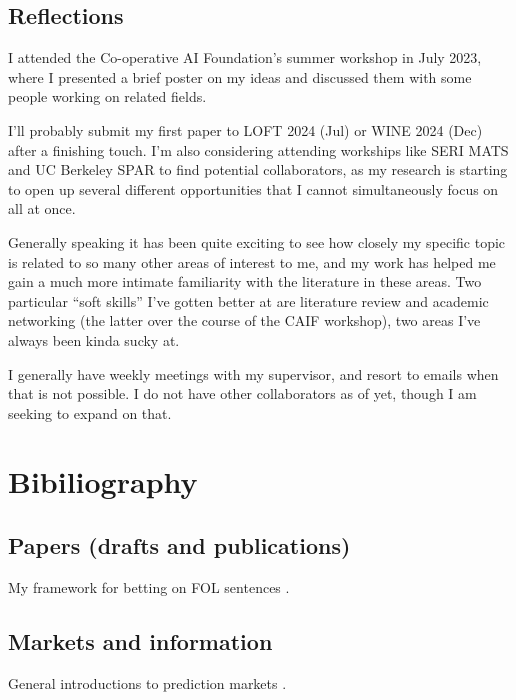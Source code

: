 \documentclass{article}
\begin{document}
\subsection{Reflections}

\begin{events*}
    I attended the Co-operative AI Foundation's summer workshop in July 2023, where I presented a brief poster on my ideas and discussed them with some people working on related fields. 

    I'll probably submit my first paper to LOFT 2024 (Jul) or WINE 2024 (Dec) after a finishing touch. I'm also considering attending workships like SERI MATS and UC Berkeley SPAR to find potential collaborators, as my research is starting to open up several different opportunities that I cannot simultaneously focus on all at once.
\end{events*}

\begin{skills*}
    Generally speaking it has been quite exciting to see how closely my specific topic is related to so many other areas of interest to me, and my work has helped me gain a much more intimate familiarity with the literature in these areas. Two particular ``soft skills'' I've gotten better at are literature review and academic networking (the latter over the course of the CAIF workshop), two areas I've always been kinda sucky at. 
\end{skills*}

\begin{collaboration*}
    I generally have weekly meetings with my supervisor, and resort to emails when that is not possible. I do not have other collaborators as of yet, though I am seeking to expand on that.
\end{collaboration*}

\section*{Bibiliography}

\subsection*{Papers (drafts and publications)}
My framework for betting on FOL sentences \cite{abhimanyupallavisudhirBettingWhatNeither2023}.
\newrefcontext[labelprefix=O]
\printbibliography[filter=self]


\subsection*{Markets and information}
General introductions to prediction markets \cite{conitzerPredictionMarketsMechanism2012, hansonLogarithmicMarketScoring2002, hansonCombinatorialInformationMarket2003}.
\newrefcontext[labelprefix=MI]
\printbibliography[filter=predmarkets]
\end{document}
